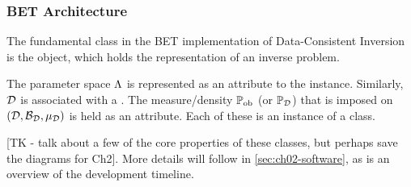 \subsubsection{BET Architecture}\label{sec:bet-architecture-overview}
The fundamental class in the BET implementation of Data-Consistent Inversion is the  object, which holds the representation of an inverse problem.

The parameter space ${\Lambda}$ is represented as an  attribute to the  instance.
Similarly, $\mathcal{D}$ is associated with a .
The measure/density $\operatorname*{\mathbb{P}_{ob}}$ (or $\mathbb{P}_{\mathcal{D}}$) that is imposed on $(\mathcal{D}, \mathcal{B}_{\mathcal{D}}, \mu_{\mathcal{D}})$ is held as an  attribute.
Each of these is an instance of a  class.

[TK - talk about a few of the core properties of these classes, but perhaps save the diagrams for Ch2].
More details will follow in \ref{sec:ch02-software}, as is an overview of the development timeline.
